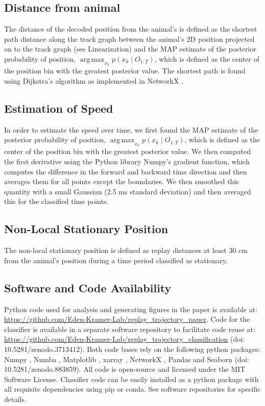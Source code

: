 \documentclass[times, twoside]{zHenriquesLab-StyleBioRxiv}
\DeclareMathOperator*{\argmax}{arg\,max}
\begin{document}
\subsection*{Distance from animal}
The distance of the decoded position from the animal's is defined as the shortest path distance along the track graph between the animal's 2D position projected on to the track graph (see Linearization) and the MAP estimate of the posterior probability of position, $\argmax_{x_k} p(x_{k} \mid O_{1:T})$, which is defined as the center of the position bin with the greatest posterior value. The shortest path is found using Dijkstra's algorithm \cite{Dijkstranotetwoproblems1959} as implemented in NetworkX \cite{HagbergExploringNetworkStructure2008}.

\subsection*{Estimation of Speed}
In order to estimate the speed over time, we first found the MAP estimate of the posterior probability of position, $\argmax_{x_k} p(x_{k} \mid O_{1:T})$, which is defined as the center of the position bin with the greatest posterior value. We then computed the first derivative using the Python library Numpy's gradient function, which computes the difference in the forward and backward time direction and then averages them for all points except the boundaries. We then smoothed this quantity with a small Gaussian (2.5 ms standard deviation) and then averaged this for the classified time points.

\subsection*{Non-Local Stationary Position}
The non-local stationary position is defined as replay distances at least 30 cm from the animal's position during a time period classified as stationary.

\subsection*{Software and Code Availability}
Python code used for analysis and generating figures in the paper is available at: \url{https://github.com/Eden-Kramer-Lab/replay_trajectory_paper}. Code for the classifier is available in a separate software repository to facilitate code reuse at: \url{https://github.com/Eden-Kramer-Lab/replay_trajectory_classification} (doi: 10.5281/zenodo.3713412).
Both code bases rely on the following python packages: Numpy \cite{vanderWaltNumPyArrayStructure2011}, Numba \cite{LamNumbaLLVMbasedPython2015}, Matplotlib \cite{HunterMatplotlib2DGraphics2007}, xarray \cite{HoyerxarrayNDlabeled2017}, NetworkX \cite{HagbergExploringNetworkStructure2008}, Pandas \cite{McKinneyDataStructuresStatistical2010} and Seaborn (doi: 10.5281/zenodo.883859). All code is open-source and licensed under the MIT Software License. Classifier code can be easily installed as a python package with all requisite dependencies using pip or conda. See software repositories for specific details.
\end{document}
